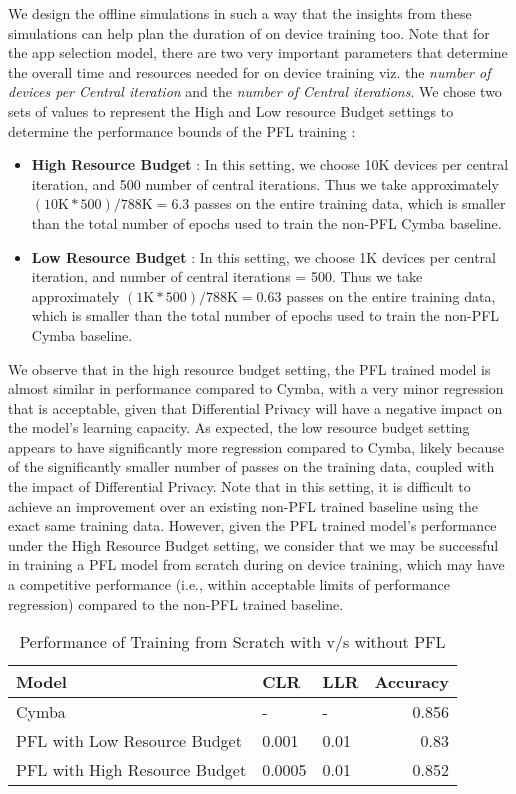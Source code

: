 We design the offline simulations in such a way that the insights from these simulations can help plan the duration of on device training too.
Note that for the app selection model, there are two very important parameters that determine the overall time and resources needed for on device training viz. the \textit{number of devices per Central iteration} and the \textit{number of Central iterations}. 
We chose two sets of values to represent the High and Low resource Budget settings to determine the performance bounds of the PFL training :
\begin{itemize}
    \item \textbf{High Resource Budget} : In this setting, we choose 10K devices per central iteration, and 500 number of central iterations. Thus we take approximately $(10\text{K} * 500)/788\text{K} = 6.3$ passes on the entire training data, which is smaller than the total number of epochs used to train the non-PFL Cymba baseline.
    \item \textbf{Low Resource Budget} : In this setting, we choose 1K devices per central iteration, and number of central iterations = 500. Thus we take approximately $(1\text{K} * 500)/788{\text{K}} = 0.63$ passes on the entire training data, which is smaller than the total number of epochs used to train the non-PFL Cymba baseline.
\end{itemize}
We observe that in the high resource budget setting, the PFL trained model is almost similar in performance compared to Cymba, with a very minor regression that is acceptable, given that Differential Privacy will have a negative impact on the model's learning capacity.
As expected, the low resource budget setting appears to have significantly more regression compared to Cymba, likely because of the significantly smaller number of passes on the training data, coupled with the impact of Differential Privacy. 
Note that in this setting, it is difficult to achieve an improvement over an existing non-PFL trained baseline using the exact same training data.
However, given the PFL trained model's performance under the High Resource Budget setting, we consider that we may be successful in training a PFL model from scratch during on device training, which may have a competitive performance (i.e., within acceptable limits of performance regression) compared to the non-PFL trained baseline.

\begin{table}
\centering
\begin{tabular}{l|l|l|r}
Model & CLR & LLR & Accuracy\\\hline
Cymba & - & - & 0.856\\
PFL with Low Resource Budget & 0.001 & 0.01 & 0.83 \\
PFL with High Resource Budget & 0.0005 & 0.01 & 0.852
\end{tabular}
\caption{Performance of Training from Scratch with v/s without PFL}
\label{tab:scratch_train} 
\end{table}


